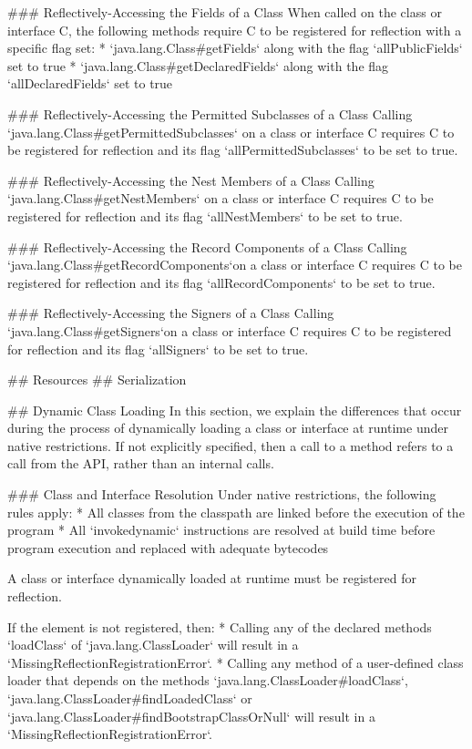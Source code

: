 ### Reflectively-Accessing the Fields of a Class
When called on the class or interface C, the following methods require C to be registered for reflection with
a specific flag set:
* `java.lang.Class#getFields` along with the flag `allPublicFields` set to true
* `java.lang.Class#getDeclaredFields` along with the flag `allDeclaredFields` set to true

### Reflectively-Accessing the Permitted Subclasses of a Class
Calling `java.lang.Class#getPermittedSubclasses` on a class or interface C requires C to be registered for reflection
and its flag `allPermittedSubclasses` to be set to true.

### Reflectively-Accessing the Nest Members of a Class
Calling `java.lang.Class#getNestMembers` on a class or interface C requires C to be registered for reflection 
and its flag `allNestMembers` to be set to true.

### Reflectively-Accessing the Record Components of a Class
Calling `java.lang.Class#getRecordComponents`on a class or interface C requires C to be registered for reflection
and its flag `allRecordComponents` to be set to true.

### Reflectively-Accessing the Signers of a Class
Calling `java.lang.Class#getSigners`on a class or interface C requires C to be registered for reflection
and its flag `allSigners` to be set to true.

## Resources
## Serialization

## Dynamic Class Loading
In this section, we explain the differences that occur during the process of dynamically loading
a class or interface at runtime under native restrictions. 
If not explicitly specified, then a call to a method refers to a call from the API, 
rather than an internal calls.

### Class and Interface Resolution
Under native restrictions, the following rules apply: 
* All classes from the classpath are linked before the execution of the program
* All `invokedynamic` instructions are resolved at build time before program execution and replaced
  with adequate bytecodes

A class or interface dynamically loaded at runtime must be registered for reflection.

If the element is not registered, then:
* Calling any of the declared methods `loadClass` of `java.lang.ClassLoader` will result in a 
`MissingReflectionRegistrationError`.
* Calling any method of a user-defined class loader that depends on the methods `java.lang.ClassLoader#loadClass`, 
`java.lang.ClassLoader#findLoadedClass` or `java.lang.ClassLoader#findBootstrapClassOrNull` 
will result in a `MissingReflectionRegistrationError`.

